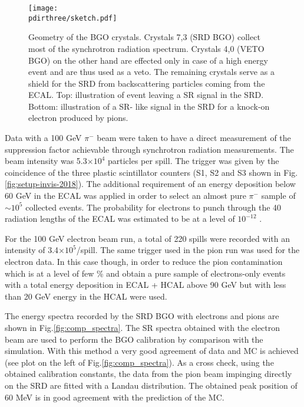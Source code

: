 \begin{figure}[htb!]
  \centering
  \texttt{[image: \\pdirthree/sketch.pdf]}
  \caption[Geometry of the BGO crystals]{Geometry of the BGO crystals. Crystals 7,3 (SRD BGO) collect most of the synchrotron radiation spectrum. Crystals 4,0 (VETO BGO) on the other hand are effected only in case of a high energy event and are thus used as a veto. The remaining crystals serve as a shield for the SRD from backscattering particles coming from the ECAL. Top: illustration of event leaving a SR signal in the SRD. Bottom: illustration of a SR- like signal in the SRD for a knock-on electron produced by pions.}
\label{fig:newgeo}
\end{figure}

Data with a 100 GeV $\pi^-$ beam were taken to have a direct measurement of the suppression factor achievable through synchrotron radiation measurements. The beam intensity was 5.3$\times 10^4$ particles per spill. The trigger was given by the coincidence of the three plastic scintillator counters (S1, S2 and S3 shown in Fig.\ref{fig:setup-invis-2018}). The additional requirement of an energy deposition below 60 GeV in the ECAL was applied in order to select an almost pure $\pi^-$ sample of $\sim 10^5$ collected events. The probability for electrons to punch through the 40 radiation lengths of the ECAL was estimated to be at a level of $10^{-12}$ \cite{Banerjee:2016tad}. 

For the 100 GeV electron beam run, a total of 220 spills were recorded with an intensity of 3.4$\times 10^5$/spill. 
The same trigger used in the pion run was used for the electron data.
In this case though, in order to reduce the pion contamination which is at a level of few \% and obtain a pure sample of electrons-only events with a total energy deposition in ECAL + HCAL above 90 GeV but with less than 20 GeV energy in the HCAL were used.  


The energy spectra recorded by the SRD BGO with electrons and pions are shown in Fig.\ref{fig:comp_spectra}. The SR spectra obtained with the electron beam are used to perform the BGO calibration by comparison with the simulation. With this method a very good agreement of data and MC is achieved (see plot on the left of Fig.\ref{fig:comp_spectra}). As a cross check, using the obtained calibration constants, the data from the pion beam impinging directly on the SRD are fitted with a Landau distribution. The obtained peak position of 60 MeV is in good agreement with the prediction of the MC. 

